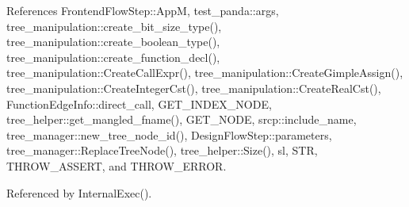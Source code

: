 References Frontend\+Flow\+Step\+::\+AppM, test\+\_\+panda\+::args, tree\+\_\+manipulation\+::create\+\_\+bit\+\_\+size\+\_\+type(), tree\+\_\+manipulation\+::create\+\_\+boolean\+\_\+type(), tree\+\_\+manipulation\+::create\+\_\+function\+\_\+decl(), tree\+\_\+manipulation\+::\+Create\+Call\+Expr(), tree\+\_\+manipulation\+::\+Create\+Gimple\+Assign(), tree\+\_\+manipulation\+::\+Create\+Integer\+Cst(), tree\+\_\+manipulation\+::\+Create\+Real\+Cst(), Function\+Edge\+Info\+::direct\+\_\+call, G\+E\+T\+\_\+\+I\+N\+D\+E\+X\+\_\+\+N\+O\+DE, tree\+\_\+helper\+::get\+\_\+mangled\+\_\+fname(), G\+E\+T\+\_\+\+N\+O\+DE, srcp\+::include\+\_\+name, tree\+\_\+manager\+::new\+\_\+tree\+\_\+node\+\_\+id(), Design\+Flow\+Step\+::parameters, tree\+\_\+manager\+::\+Replace\+Tree\+Node(), tree\+\_\+helper\+::\+Size(), sl, S\+TR, T\+H\+R\+O\+W\+\_\+\+A\+S\+S\+E\+RT, and T\+H\+R\+O\+W\+\_\+\+E\+R\+R\+OR.



Referenced by Internal\+Exec().

